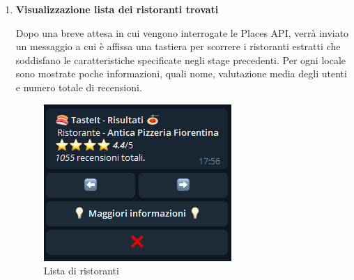 \documentclass[a4paper, 12pt]{article}
\begin{document}
\begin{enumerate}
		\item \textbf{Visualizzazione lista dei ristoranti trovati}
		
		Dopo una breve attesa in cui vengono interrogate le Places API, verrà inviato un messaggio a cui è affissa una tastiera per scorrere i ristoranti estratti che soddisfano le caratteristiche specificate negli stage precedenti. Per ogni locale sono mostrate poche informazioni, quali nome, valutazione media degli utenti e numero totale di recensioni. 
			
		\newpage
		\begin{figure}[!htb]
			\begin{minipage}{0.35\textwidth}
				\centering
				\includegraphics[width=\linewidth]{cercaCommand_generalRestaurantInfoList.png}
				\caption{Lista di ristoranti}
			\end{minipage}\hfill
			\begin{minipage}{0.35\textwidth}
				\centering

\end{minipage}
\end{figure}
\end{enumerate}
\end{document}
